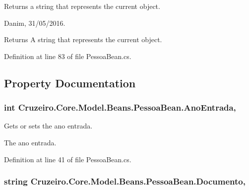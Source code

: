 Returns a string that represents the current object. 

Danim, 31/05/2016. 

\begin{DoxyReturn}{Returns}
A string that represents the current object. 
\end{DoxyReturn}


Definition at line 83 of file Pessoa\+Bean.\+cs.



\subsection{Property Documentation}
\subsubsection[{\texorpdfstring{Ano\+Entrada}{AnoEntrada}}]{\setlength{\rightskip}{0pt plus 5cm}int Cruzeiro.\+Core.\+Model.\+Beans.\+Pessoa\+Bean.\+Ano\+Entrada\hspace{0.3cm}{\ttfamily [get]}, {\ttfamily [set]}}\hypertarget{class_cruzeiro_1_1_core_1_1_model_1_1_beans_1_1_pessoa_bean_ad1885bcbe8c4a56a9cc6e516da61e5f4}{}\label{class_cruzeiro_1_1_core_1_1_model_1_1_beans_1_1_pessoa_bean_ad1885bcbe8c4a56a9cc6e516da61e5f4}


Gets or sets the ano entrada. 

The ano entrada. 

Definition at line 41 of file Pessoa\+Bean.\+cs.

\subsubsection[{\texorpdfstring{Documento}{Documento}}]{\setlength{\rightskip}{0pt plus 5cm}string Cruzeiro.\+Core.\+Model.\+Beans.\+Pessoa\+Bean.\+Documento\hspace{0.3cm}{\ttfamily [get]}, {\ttfamily [set]}}\hypertarget{class_cruzeiro_1_1_core_1_1_model_1_1_beans_1_1_pessoa_bean_a15d5831bce53d067066ca342a477a468}{}\label{class_cruzeiro_1_1_core_1_1_model_1_1_beans_1_1_pessoa_bean_a15d5831bce53d067066ca342a477a468}


